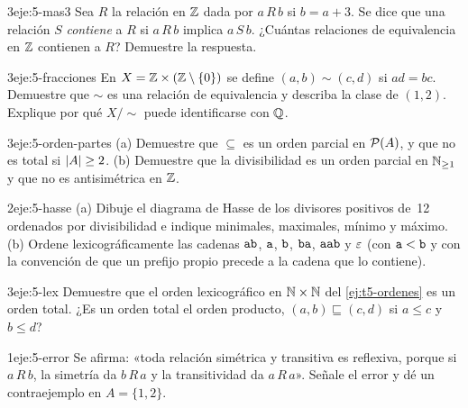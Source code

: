 \begin{ejercicio}{3}{eje:5-mas3}
Sea $R$ la relación en $\mathbb{Z}$ dada por $a\,R\,b$ si $b=a+3$. Se dice que una relación $S$ \emph{contiene} a $R$ si $a\,R\,b$ implica $a\,S\,b$. ¿Cuántas relaciones de equivalencia en $\mathbb{Z}$ contienen a $R$? Demuestre la respuesta.
\end{ejercicio}

\begin{ejercicio}{3}{eje:5-fracciones}
En $X=\mathbb{Z}\times(\mathbb{Z}\setminus\{0\})$ se define $(a,b)\sim(c,d)$ si $ad=bc$. Demuestre que $\sim$ es una relación de equivalencia y describa la clase de $(1,2)$. Explique por qué $X/{\sim}$ puede identificarse con $\mathbb{Q}$.
\end{ejercicio}

\begin{ejercicio}{3}{eje:5-orden-partes}
(a) Demuestre que $\subseteq$ es un orden parcial en $\mathcal{P}(A)$, y que no es total si $\lvert A\rvert\ge2$. (b) Demuestre que la divisibilidad es un orden parcial en $\mathbb{N}_{\ge1}$ y que no es antisimétrica en $\mathbb{Z}$.
\end{ejercicio}

\begin{ejercicio}{2}{eje:5-hasse}
(a) Dibuje el diagrama de Hasse de los divisores positivos de~12 ordenados por divisibilidad e indique minimales, maximales, mínimo y máximo. (b) Ordene lexicográficamente las cadenas $\texttt{ab}$, $\texttt{a}$, $\texttt{b}$, $\texttt{ba}$, $\texttt{aab}$ y $\varepsilon$ (con $\texttt{a}<\texttt{b}$ y con la convención de que un prefijo propio precede a la cadena que lo contiene).
\end{ejercicio}

\begin{ejercicio}{3}{eje:5-lex}
Demuestre que el orden lexicográfico en $\mathbb{N}\times\mathbb{N}$ del \cref{ej:t5-ordenes} es un orden total. ¿Es un orden total el orden producto, $(a,b)\sqsubseteq(c,d)$ si $a\le c$ y $b\le d$?
\end{ejercicio}

\begin{ejercicio}{1}{eje:5-error}
Se afirma: «toda relación simétrica y transitiva es reflexiva, porque si $a\,R\,b$, la simetría da $b\,R\,a$ y la transitividad da $a\,R\,a$». Señale el error y dé un contraejemplo en $A=\{1,2\}$.
\end{ejercicio}
